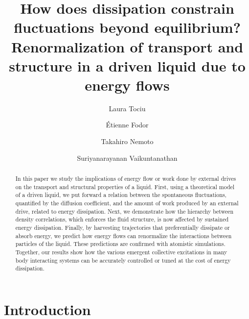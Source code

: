 \documentclass[pre, superscriptaddress, twocolumn,pre]{revtex4-1}
\begin{document}
\title{How does dissipation constrain fluctuations beyond equilibrium?\\Renormalization of transport and structure in a driven liquid due to energy flows}

\author{Laura Tociu}

\author{\'Etienne Fodor}

\author{Takahiro Nemoto}

\author{Suriyanarayanan Vaikuntanathan}

\begin{abstract}
	In this paper we study the implications of energy flow or work done by external drives on the transport and structural properties of a liquid. First, using a theoretical model of a driven liquid, we put forward a relation between the spontaneous fluctuations, quantified by the diffusion coefficient, and the amount of work produced by an external drive, related to energy dissipation. Next, we demonstrate how the hierarchy between density correlations, which enforces the fluid structure, is now affected by sustained energy dissipation. Finally, by harvesting trajectories that preferentially dissipate or absorb energy, we predict how energy flows can renormalize the interactions between particles of the liquid. These predictions are confirmed with atomistic simulations. Together, our results show how the various emergent collective excitations in many body interacting systems can be accurately controlled or tuned at the cost of energy dissipation. 
	\end{abstract}

\maketitle 




\section{Introduction}
\end{document}
